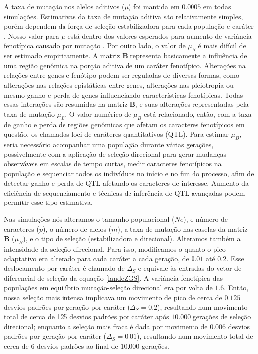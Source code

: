 A taxa de mutação nos alelos aditivos ($\mu$) foi mantida em $0.0005$ em
todas simulações.
Estimativas da taxa de mutação aditiva são relativamente
simples, porém dependem da força de seleção estabilizadora para cada
população e caráter \citep{Lynch1998}.
Nosso valor para $\mu$ está dentro dos valores esperados para aumento de
variância fenotípica causado por mutação \citep{Burger1994}.
Por outro lado, o valor de $\mu_B$ é mais difícil de ser estimado empiricamente.
A matriz $\mathbf{B}$ representa basicamente a influência de uma região
genômica na porção aditiva de um caráter fenotípico.
Alterações na relações entre genes e fenótipo podem ser reguladas de
diversas formas, como alterações nas relações epistáticas entre genes,
alterações nas pleiotropia ou mesmo ganho e perda de genes influenciando
características fenotípicas.
Todas essas interações são resumidas na matriz $\mathbf{B}$, e suas
alterações representadas pela taxa de mutação $\mu_B$.
O valor numérico de $\mu_B$ está relacionado, então, com a taxa de ganho
e perda de regiões genômicas que afetam os caracteres fenotípicos em
questão, os chamados loci de caráteres quantitativos (QTL).
Para estimar $\mu_B$, seria necessário acompanhar uma população durante
várias gerações, possivelmente com a aplicação de seleção direcional
para gerar mudanças observáveis em escalas de tempo curtas, medir
caracteres fenotípicos na população e sequenciar todos os indivíduos no
início e no fim do processo, afim de detectar ganho e perda de QTL
afetando os caracteres de interesse.
Aumento da eficiência de sequenciamento e técnicas de inferência de QTL
avançadas podem permitir esse tipo estimativa.

Nas simulações nós alteramos o tamanho populacional ($Ne$), o número de
caracteres ($p$), o número de alelos ($m$), a taxa de mutação nas caselas da
matriz $\mathbf{B}$ ($\mu_B$), e o tipo de seleção (estabilizadora e direcional).
Alteramos também a intensidade da seleção direcional.
Para isso, modificamos o quanto o pico adaptativo era alterado para cada
caráter a cada geração, de $0.01$ até $0.2$.
Esse deslocamento por caráter é chamado de $\Delta_S$ e equivale às
entradas do vetor de diferencial de seleção da equação \ref{landeZGS}.
A variância fenotípica das populações em equilíbrio mutação-seleção
direcional era por volta de $1.6$.
Então, nossa seleção mais intensa implicava um movimento de pico de
cerca de $0.125$ desvios padrões por geração por caráter ($\Delta_S=0.2$),
resultando num movimento total de cerca de 125 desvios padrões por caráter
após $10.000$ gerações de seleção direcional; enquanto a seleção mais
fraca é dada por movimento de $0.006$ desvios padrões por geração por caráter
($\Delta_S=0.01$), resultando num movimento total de cerca de 6 desvios
padrões ao final de $10.000$ gerações.

